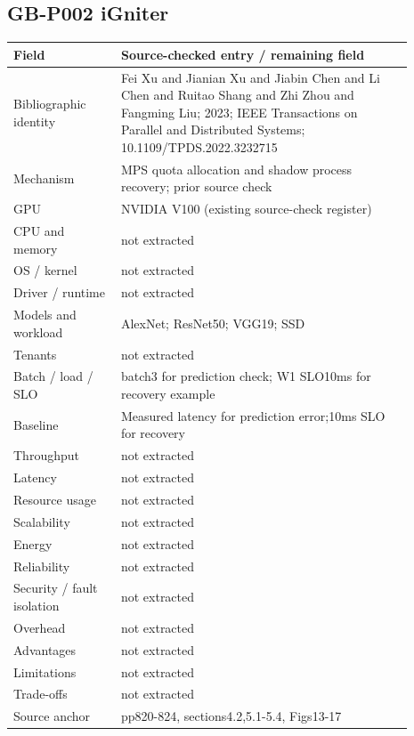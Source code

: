 \documentclass[12pt,a4paper]{article}
\begin{document}
\subsection{GB-P002 iGniter}
\begin{longtable}{p{0.24\linewidth}p{0.65\linewidth}}
\toprule
Field & Source-checked entry /\allowbreak{} remaining field\\\midrule
\endhead
Bibliographic identity & Fei Xu and Jianian Xu and Jiabin Chen and Li Chen and Ruitao Shang and Zhi Zhou and Fangming Liu; 2023; IEEE Transactions on Parallel and Distributed Systems; 10.1109/\allowbreak{}TPDS.2022.3232715\\
Mechanism & MPS quota allocation and shadow process recovery; prior source check\\
GPU & NVIDIA V100 (existing source-check register)\\
CPU and memory & not extracted\\
OS /\allowbreak{} kernel & not extracted\\
Driver /\allowbreak{} runtime & not extracted\\
Models and workload & AlexNet; ResNet50; VGG19; SSD\\
Tenants & not extracted\\
Batch /\allowbreak{} load /\allowbreak{} SLO & batch3 for prediction check; W1 SLO10ms for recovery example\\
Baseline & Measured latency for prediction error;10ms SLO for recovery\\
Throughput & not extracted\\
Latency & not extracted\\
Resource usage & not extracted\\
Scalability & not extracted\\
Energy & not extracted\\
Reliability & not extracted\\
Security /\allowbreak{} fault isolation & not extracted\\
Overhead & not extracted\\
Advantages & not extracted\\
Limitations & not extracted\\
Trade-offs & not extracted\\
Source anchor & pp820-824, sections4.2,5.1-5.4, Figs13-17\\
\bottomrule
\end{longtable}
\end{document}
